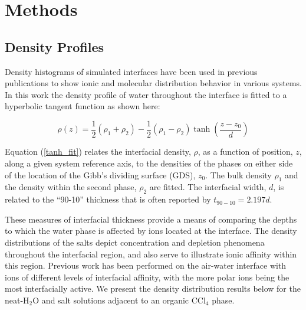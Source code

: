 \section{Methods}

\subsection{Density Profiles}

Density histograms of simulated interfaces have been used in previous publications to show ionic and molecular distribution behavior in various systems.\cite{Chang1995,Eggimann2008,Du2008,Wick2006c,Petersen2005a,Hore2008,Walker2006b,Walker2007b} In this work the density profile of water throughout the interface is fitted to a hyperbolic tangent function\cite{Wick2006c,MATSUMOTO1988} as shown here:

\begin{equation}\label{tanh_fit}
	\rho(z) = \frac12(\rho_1+\rho_2) - \frac12\left(\rho_1-\rho_2\right)\tanh\left(\frac{z-z_0}{d}\right)
\end{equation}

Equation (\ref{tanh_fit}) relates the interfacial density, $\rho$, as a function of position, $z$, along a given system reference axis, to the densities of the phases on either side of the location of the Gibb's dividing surface (GDS), $z_0$. The bulk density $\rho_1$ and the density within the second phase, $\rho_2$ are fitted.  The interfacial width, $d$, is related to the ``90-10'' thickness that is often reported by $t_{90-10} = 2.197d$.

These measures of interfacial thickness provide a means of comparing the depths to which the water phase is affected by ions located at the interface. The density distributions of the salts depict concentration and depletion phenomena throughout the interfacial region, and also serve to illustrate ionic affinity within this region. Previous work has been performed on the air-water interface with ions of different levels of interfacial affinity, with the more polar ions being the most interfacially active.\cite{Luo2006,Petersen2006,Petersen2005a,Allen2009,Hofft2006,Beattie2005,Bian2009,Dang2004b} We present the density distribution results below for the neat-H$_2$O and salt solutions adjacent to an organic CCl$_4$ phase. %

